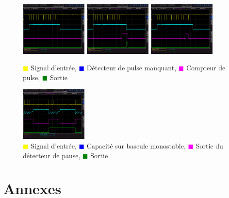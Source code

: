\documentclass[french]{layout/Report}
\begin{document}
\begin{figure}[h]
\centering
\includegraphics[width=0.3\textwidth]{../measurements/SCR06}
\includegraphics[width=0.3\textwidth]{../measurements/SCR07}
\includegraphics[width=0.3\textwidth]{../measurements/SCR08}
\caption{
\textcolor{yellow}{$\blacksquare$} Signal d'entrée,
\textcolor{blue}{$\blacksquare$} Détecteur de pulse manquant,
\textcolor{magenta}{$\blacksquare$} Compteur de pulse,
\textcolor{green}{$\blacksquare$} Sortie
}
\label{fig:decoder_signal}
\end{figure}

\begin{figure}[h]{}
\centering
\includegraphics[width=0.3\textwidth]{../measurements/SCR12}
\caption{
\textcolor{yellow}{$\blacksquare$} Signal d'entrée,
\textcolor{blue}{$\blacksquare$} Capacité sur bascule monostable,
\textcolor{magenta}{$\blacksquare$} Sortie du détecteur de pause,
\textcolor{green}{$\blacksquare$} Sortie
}
\label{fig:output_signal}
\end{figure}

\section{Annexes}
\end{document}

